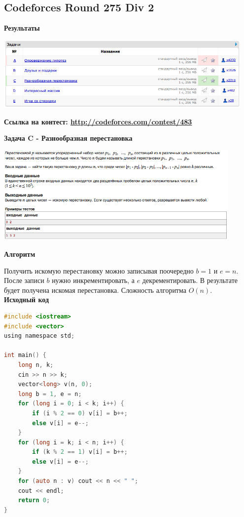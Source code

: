 \documentclass[a4paper,12pt]{article}
\begin{document}
%
%

\newpage
\subsection{Codeforces Round 275 Div 2}

\textbf{{\large Результаты}} \\
\begin{center}
\includegraphics[width=0.95\textwidth]{C_275/C_275_result.png}\\ [1cm]
\end{center}

\textbf{{\large Ссылка на контест: \url{http://codeforces.com/contest/483}}}

\newpage
\textbf{{\large Задача C - Разнообразная перестановка}}

\begin{center}
\includegraphics[width=0.9\textwidth]{C_275/C_275_C.png}\\ [1cm]
\end{center}

\textbf{{\large Алгоритм}}

Получить искомую перестановку можно записывая поочередно $b = 1$ и $e = n$. После записи $b$ нужно инкрементировать, а $e$ декрементировать. В результате будет получена искомая перестановка. Сложность алгоритма $O(n)$.\\

\textbf{{\large Исходный код}} \\
\begin{lstlisting}[language=C]
#include <iostream>
#include <vector>
using namespace std;

int main() {
    long n, k;
    cin >> n >> k;
    vector<long> v(n, 0);
    long b = 1, e = n;
    for (long i = 0; i < k; i++) {
        if (i % 2 == 0) v[i] = b++;
        else v[i] = e--;
    }
    for (long i = k; i < n; i++) {
        if (k % 2 == 1) v[i] = b++;
        else v[i] = e--;
    }
    for (auto n : v) cout << n << " ";
    cout << endl;
    return 0;
}
\end{lstlisting}
\end{document}
